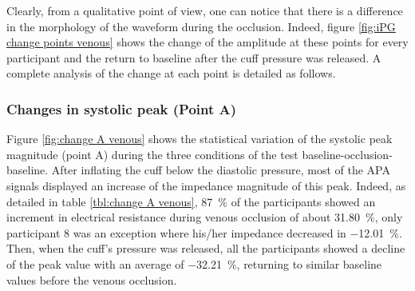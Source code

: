 Clearly,  from a qualitative point of view, one can notice that there is a difference in the morphology of the waveform during the occlusion.  Indeed, figure \ref{fig:iPG change points venous} shows the change of the amplitude at these points for every participant and the return to baseline after the cuff pressure was released. A complete analysis of the change at each point is detailed as follows.

\subsubsection{Changes in systolic peak (Point A)}
\label{section apa 2.1.1}
Figure \ref{fig:change A venous} shows the statistical variation of the systolic peak magnitude (point A) during the three conditions of the test baseline-occlusion-baseline. After inflating the cuff below the diastolic pressure, most of the APA signals displayed an increase of the impedance magnitude of this peak. Indeed, as detailed in table \ref{tbl:change A venous}, \SI{87}{\percent} of the participants showed an increment in electrical resistance during venous occlusion of about \SI{31.80}{\percent}, only participant 8 was an exception where his/her impedance decreased in \SI{-12.01}{\percent}. Then, when the cuff's pressure was released, all the participants showed a decline of the peak value with an average of \SI{-32.21}{\percent}, returning to similar baseline values before the venous occlusion.

